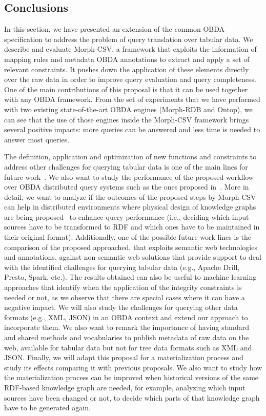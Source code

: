 \subsection{Conclusions}
In this section, we have presented an extension of the common OBDA specification to address the problem of query translation over tabular data. We describe and evaluate Morph-CSV, a framework that exploits the information of mapping rules and metadata OBDA annotations to extract and apply a set of relevant constraints. It pushes down the application of these elements directly over the raw data in order to improve query evaluation and query completeness. One of the main contributions of this proposal is that it can be used together with any OBDA framework. From the set of experiments that we have performed with two existing state-of-the-art OBDA engines (Morph-RDB and Ontop), we can see that the use of those engines inside the Morph-CSV framework brings several positive impacts: more queries can be answered and less time is needed to answer most queries.

The definition, application and optimization of new functions and constraints to address other challenges for querying tabular data is one of the main lines for future work~\citep{iglesias2019enhancing}. We also want to study the performance of the proposed workflow over OBDA distributed query systems such as the ones proposed in~\citep{endris2019ontario,mami2019squerall}. More in detail, we want to analyze if the outcomes of the proposed steps by Morph-CSV can help in distributed environments where physical design of knowledge graphs are being proposed~\citep{rohde2020optimizing,upm63647} to enhance query performance (i.e., deciding which input sources have to be transformed to RDF and which ones have to be maintained in their original format). Additionally, one of the possible future work lines is the comparison of the proposed approached, that exploits semantic web technologies and annotations, against non-semantic web solutions that provide support to deal with the identified challenges for querying tabular data (e.g., Apache Drill, Presto, Spark, etc.). The results obtained can also be useful to machine learning approaches that identify when the application of the integrity constraints is needed or not, as we observe that there are special cases where it can have a negative impact. We will also study the challenges for querying other data formats (e.g., XML, JSON) in an OBDA context and extend our approach to incorporate them. We also want to remark the importance of having standard and shared methods and vocabularies to publish metadata of raw data on the web, available for tabular data but not for tree data formats such as XML and JSON. Finally, we will adapt this proposal for a materialization process and study its effects comparing it with previous proposals. We also want to study how the materialization process can be improved when historical versions of the same RDF-based knowledge graph are needed, for example, analyzing which input sources have been changed or not, to decide which parts of that knowledge graph have to be generated again.




